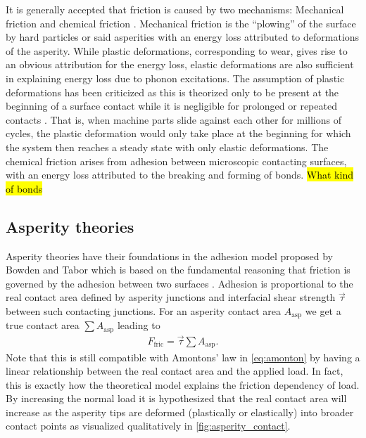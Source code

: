 It is generally accepted that friction is caused by two mechanisms: Mechanical
friction and chemical friction \cite{kim_nano-scale_2009}. Mechanical
friction is the ``plowing'' of the surface by hard particles or said asperities
with an energy loss attributed to deformations of the asperity. While plastic
deformations, corresponding to wear, gives rise to an obvious attribution for
the energy loss, elastic deformations are also sufficient in explaining energy
loss due to phonon excitations. The assumption of plastic deformations
has been criticized as this is theorized only to be present at the beginning of
a surface contact while it is negligible for prolonged or repeated contacts
\cite{CARBONE20082555}. That is, when machine parts slide against each other for
millions of cycles, the plastic deformation would only take place at the beginning for which the system then reaches a steady state with only elastic deformations.
The chemical friction arises from adhesion between microscopic contacting
surfaces, with an energy loss attributed to the breaking and forming of bonds. \hl{What kind of bonds} 



\subsection{Asperity theories} %

Asperity theories have their foundations in the adhesion model proposed by Bowden and Tabor \cite{bowden2001friction} which is based on the fundamental reasoning that friction is governed by the adhesion between two surfaces \cite{Kim_2012}. Adhesion is proportional to the real contact area defined by asperity junctions and interfacial shear strength $\vec{\tau}$ between such contacting junctions. For an asperity contact area $A_{\text{asp}}$ we get a true contact area $\sum A_{\text{asp}}$ leading to 
\begin{align*}
  F_\text{fric} = \vec{\tau} \sum A_{\text{asp}}.
\end{align*}
Note that this is still compatible with Amontons’ law in \cref{eq:amonton} by having a linear relationship between the real contact area and the
applied load. In fact, this is exactly how the theoretical model explains the friction dependency of load. By increasing the normal load it is hypothesized that the real contact area will increase as the asperity tips are deformed (plastically or elastically) into broader contact points as visualized qualitatively in \cref{fig:asperity_contact}.

